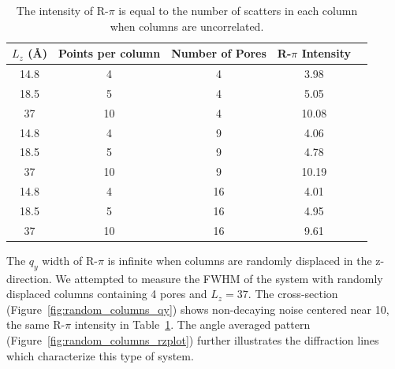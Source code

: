 \documentclass{article}
\begin{document}
  \begin{table}[!htb]
  \centering
  \begin{tabular}{c c c c c}
  \toprule
  $L_z$ (\AA) & Points per column & Number of Pores &  R-$\pi$ Intensity\\ 
  \midrule
  14.8        &      4            & 4               & 3.98              \\
  18.5        &      5            & 4               & 5.05              \\
  37          &      10           & 4               & 10.08             \\
  14.8        &      4            & 9               & 4.06              \\
  18.5        &      5            & 9               & 4.78              \\
  37          &      10           & 9               & 10.19             \\
  14.8        &      4            & 16              & 4.01              \\
  18.5        &      5            & 16              & 4.95              \\
  37          &      10           & 16              & 9.61              \\
  \bottomrule
  \end{tabular}
  \caption{The intensity of R-$\pi$ is equal to the number of scatters in 
   each column when columns are uncorrelated.}\label{table:randomly_displaced_columns}
  \end{table}

  The $q_y$ width of R-$\pi$ is infinite when columns are randomly displaced in
  the z-direction. We attempted to measure the FWHM of the system with randomly
  displaced columns containing 4 pores and $L_z = 37$. The cross-section
  (Figure~\ref{fig:random_columns_qy}) shows non-decaying noise centered near 10,
  the same R-$\pi$ intensity in Table~\ref{table:randomly_displaced_columns}. The 
  angle averaged pattern (Figure~\ref{fig:random_columns_rzplot}) further illustrates
  the diffraction lines which characterize this type of system.
\end{document}
